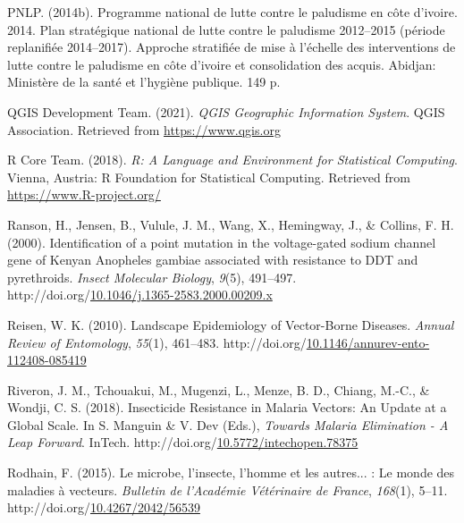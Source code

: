 \documentclass[12pt,twoside]{reedthesis}
\newlength{\cslhangindent}
\newenvironment{CSLReferences}[2] %
 {%
  \setlength{\parindent}{0pt}
  \ifodd #1 \everypar{\setlength{\hangindent}{\cslhangindent}}\ignorespaces\fi
  \ifnum #2 > 0
  \setlength{\parskip}{#2\baselineskip}
  \fi
 }%
 {}
\begin{document}
\begin{CSLReferences}{1}{0}
\leavevmode{}%
PNLP. (2014b). Programme national de lutte contre le paludisme en côte d'ivoire. 2014. Plan stratégique national de lutte contre le paludisme 2012--2015 (période replanifiée 2014--2017). Approche stratifiée de mise à l'échelle des interventions de lutte contre le paludisme en côte d'ivoire et consolidation des acquis. Abidjan: Ministère de la santé et l'hygiène publique. 149 p.

\leavevmode{}%
QGIS Development Team. (2021). \emph{{QGIS} {Geographic} {Information} {System}}. QGIS Association. Retrieved from \url{https://www.qgis.org}

\leavevmode{}%
R Core Team. (2018). \emph{R: {A} {Language} and {Environment} for {Statistical} {Computing}}. Vienna, Austria: R Foundation for Statistical Computing. Retrieved from \url{https://www.R-project.org/}

\leavevmode{}%
Ranson, H., Jensen, B., Vulule, J. M., Wang, X., Hemingway, J., \& Collins, F. H. (2000). Identification of a point mutation in the voltage-gated sodium channel gene of {Kenyan} {Anopheles} gambiae associated with resistance to {DDT} and pyrethroids. \emph{Insect Molecular Biology}, \emph{9}(5), 491--497. http://doi.org/\href{https://doi.org/10.1046/j.1365-2583.2000.00209.x}{10.1046/j.1365-2583.2000.00209.x}

\leavevmode{}%
Reisen, W. K. (2010). Landscape {Epidemiology} of {Vector}-{Borne} {Diseases}. \emph{Annual Review of Entomology}, \emph{55}(1), 461--483. http://doi.org/\href{https://doi.org/10.1146/annurev-ento-112408-085419}{10.1146/annurev-ento-112408-085419}

\leavevmode{}%
Riveron, J. M., Tchouakui, M., Mugenzi, L., Menze, B. D., Chiang, M.-C., \& Wondji, C. S. (2018). Insecticide {Resistance} in {Malaria} {Vectors}: {An} {Update} at a {Global} {Scale}. In S. Manguin \& V. Dev (Eds.), \emph{Towards {Malaria} {Elimination} - {A} {Leap} {Forward}}. InTech. http://doi.org/\href{https://doi.org/10.5772/intechopen.78375}{10.5772/intechopen.78375}

\leavevmode{}%
Rodhain, F. (2015). Le microbe, l'insecte, l'homme et les autres... : Le monde des maladies à vecteurs. \emph{Bulletin de l'Académie Vétérinaire de France}, \emph{168}(1), 5--11. http://doi.org/\href{https://doi.org/10.4267/2042/56539}{10.4267/2042/56539}


\end{CSLReferences}
\end{document}
